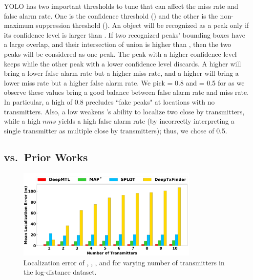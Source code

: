  YOLO has two important thresholds to tune that can affect the miss rate and false alarm rate. 
One is the confidence threshold (\conf) and the other is the non-maximum suppression threshold (\nms).
An object will be recognized as a peak only if its confidence level is larger than \conf.
If two recognized peaks' bounding boxes have a large overlap, and their intersection of union is higher than \nms, then the two peaks will be considered as one peak. 
The peak with a higher confidence level keeps while the other peak with a lower confidence level discards.
A higher \conf will bring a lower false alarm rate but a higher miss rate, and a higher \nms will bring a lower miss rate but a higher false alarm rate.
We pick \conf= 0.8 and \nms= 0.5 for \our as we observe these values bring a good balance between false alarm rate and miss rate.
In particular, a high \conf of 0.8  precludes ``fake peaks" at locations with no transmitters.
Also, a low \nms weakens \our's ability to localize two close by transmitters, while a high $nms$ yields
a high false alarm rate (by incorrectly interpreting a single transmitter as multiple close by transmitters); thus, we chose \nms of 0.5.




\subsection{\our vs.\ Prior Works}
\label{subsec:vs_prior}

\begin{figure}[t]
	\centering
	\includegraphics[width=0.8\textwidth]{chapters/wowmom-pmc/figures/log_distance-error_vary_numintru.png}
	\caption{Localization error of \our, \map, \splot, and \deeptx for varying number of transmitters in the log-distance dataset.}
	\label{fig:logdist-error-vary_numintru}
\end{figure}



